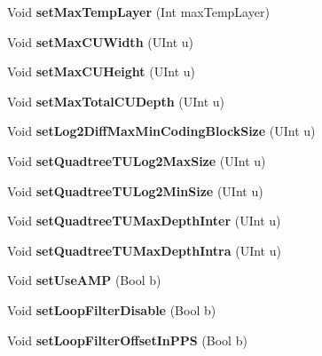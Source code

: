 \begin{DoxyCompactItemize}
Void {\bfseries set\+Max\+Temp\+Layer} (Int max\+Temp\+Layer)
\item 
\mbox{\label{class_t_enc_cfg_a3b48f561d81e756077eb68ae56dc59c9}} 
Void {\bfseries set\+Max\+C\+U\+Width} (U\+Int u)
\item 
\mbox{\label{class_t_enc_cfg_a93b795f70f07552c248efd79d961d189}} 
Void {\bfseries set\+Max\+C\+U\+Height} (U\+Int u)
\item 
\mbox{\label{class_t_enc_cfg_a89ab11b45b550ed02b8777eaa148c721}} 
Void {\bfseries set\+Max\+Total\+C\+U\+Depth} (U\+Int u)
\item 
\mbox{\label{class_t_enc_cfg_aa8af0f8d4b9529237e1a5d1f640f8f02}} 
Void {\bfseries set\+Log2\+Diff\+Max\+Min\+Coding\+Block\+Size} (U\+Int u)
\item 
\mbox{\label{class_t_enc_cfg_ad7673d63a1ec955596aaeb707337ad35}} 
Void {\bfseries set\+Quadtree\+T\+U\+Log2\+Max\+Size} (U\+Int u)
\item 
\mbox{\label{class_t_enc_cfg_a9c85ee03a77a5b0566127a3ec766a317}} 
Void {\bfseries set\+Quadtree\+T\+U\+Log2\+Min\+Size} (U\+Int u)
\item 
\mbox{\label{class_t_enc_cfg_a4d8bc15c0fc63d4d444ab69689a7dbcd}} 
Void {\bfseries set\+Quadtree\+T\+U\+Max\+Depth\+Inter} (U\+Int u)
\item 
\mbox{\label{class_t_enc_cfg_adecfb480c2202bc91a199e14e35de49d}} 
Void {\bfseries set\+Quadtree\+T\+U\+Max\+Depth\+Intra} (U\+Int u)
\item 
\mbox{\label{class_t_enc_cfg_a755df61a6bfc5666b4151f645e23eb02}} 
Void {\bfseries set\+Use\+A\+MP} (Bool b)
\item 
\mbox{\label{class_t_enc_cfg_af21647c92231825b0dd28f33ad7597bf}} 
Void {\bfseries set\+Loop\+Filter\+Disable} (Bool b)
\item 
\mbox{\label{class_t_enc_cfg_ad23cf096d8ace599f19a2ca1af1c9ad3}} 
Void {\bfseries set\+Loop\+Filter\+Offset\+In\+P\+PS} (Bool b)

\end{DoxyCompactItemize}
